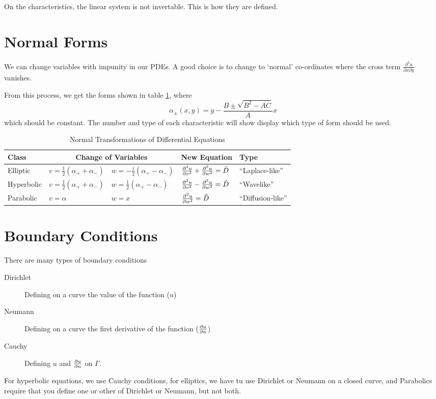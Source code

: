 \documentclass[a4paper,12pt,parskip=full,BCOR=1cm]{scrreprt}
\begin{document}
On the characteristics, the linear system is not invertable.
This is how they are defined.



\section{Normal Forms}
We can change variables with impunity in our PDEs.
A good choice is to change to `normal' co-ordinates where the cross term $\frac{\partial^2 u}{\partial x \partial y}$ vanishes.

From this process, we get the forms shown in table \ref{tbl:normaltransformations}, where $$\alpha_\pm(x,y) = y - \frac{B\pm\sqrt{B^2 - AC}}{A}x$$ which should be constant.
The number and type of each characteristic will show display which type of form should be used.

\begin{table}[htb]
 \centering
 \begin{tabular}{lllll}
  \toprule
  Class      & \multicolumn{2}{c}{Change of Variables} & New Equation                        & Type                                                           \\
  \midrule
  Elliptic   & $v=\frac{1}{2}(\alpha_+ + \alpha_-)$    & $w=-\frac{i}{2}(\alpha_+-\alpha_-)$ & $\pdv[2]{u}{v} + \pdv[2]{u}{w}=\tilde{D}$ & ``Laplace-like''   \\
  Hyperbolic & $v=\frac{1}{2}(\alpha_+ + \alpha_-)$    & $w=\frac{1}{2}(\alpha_+-\alpha_-)$  & $\pdv[2]{u}{v} - \pdv[2]{u}{w}=\tilde{D}$ & ``Wavelike''       \\
  Parabolic  & $v=\alpha$                              & $w=x$                               & $\pdv[2]{u}{w}=\tilde{D}$                 & ``Diffusion-like'' \\\bottomrule
 \end{tabular}
 \caption{Normal Transformations of Differential Equations}\label{tbl:normaltransformations}
\end{table}

\section{Boundary Conditions}
There are many types of boundary conditions
\begin{description}
 \item [Dirichlet] Defining on a curve the value of the function ($u$)
 \item [Neumann] Defining on a curve the first derivative of the function ($\pdv{u}{n}$)
 \item [Cauchy] Defining $u$ and $\pdv{u}{n}$ on $\Gamma$.
\end{description}
For hyperbolic equations, we use Cauchy conditions, for elliptics, we have tu use Dirichlet or Neumann on a closed curve, and Parabolics require that you define one or other of Dirichlet or Neumann, but not both.
\end{document}
